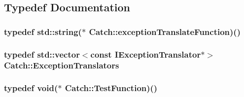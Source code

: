 \subsection{Typedef Documentation}
\hypertarget{namespace_catch_ae1727c8cadfc5ad8b43dff651cd2f8b0}{
\subsubsection[{exception\-Translate\-Function}]{\setlength{\rightskip}{0pt plus 5cm}typedef std\-::string($\ast$ Catch\-::exception\-Translate\-Function)()}}\label{namespace_catch_ae1727c8cadfc5ad8b43dff651cd2f8b0}
\hypertarget{namespace_catch_ae0442a3627f91437716106138b5f540b}{
\subsubsection[{Exception\-Translators}]{\setlength{\rightskip}{0pt plus 5cm}typedef std\-::vector$<$const {\bf I\-Exception\-Translator}$\ast$$>$ {\bf Catch\-::\-Exception\-Translators}}}\label{namespace_catch_ae0442a3627f91437716106138b5f540b}
\hypertarget{namespace_catch_a768da872b9033e4c71c6f316393d35db}{
\subsubsection[{Test\-Function}]{\setlength{\rightskip}{0pt plus 5cm}typedef void($\ast$ Catch\-::\-Test\-Function)()}}\label{namespace_catch_a768da872b9033e4c71c6f316393d35db}



